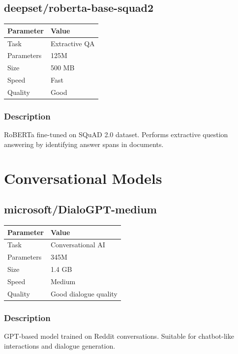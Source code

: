 \documentclass[12pt,a4paper]{report}
\begin{document}
\subsection{deepset/roberta-base-squad2}

\begin{tabular}{|p{3cm}|p{11cm}|}
\hline
\textbf{Parameter} & \textbf{Value} \\
\hline
Task & Extractive QA \\
\hline
Parameters & 125M \\
\hline
Size & 500 MB \\
\hline
Speed & Fast \\
\hline
Quality & Good \\
\hline
\end{tabular}

\subsubsection{Description}

RoBERTa fine-tuned on SQuAD 2.0 dataset. Performs extractive question answering by identifying answer spans in documents.

\section{Conversational Models}

\subsection{microsoft/DialoGPT-medium}

\begin{tabular}{|p{3cm}|p{11cm}|}
\hline
\textbf{Parameter} & \textbf{Value} \\
\hline
Task & Conversational AI \\
\hline
Parameters & 345M \\
\hline
Size & 1.4 GB \\
\hline
Speed & Medium \\
\hline
Quality & Good dialogue quality \\
\hline
\end{tabular}

\subsubsection{Description}

GPT-based model trained on Reddit conversations. Suitable for chatbot-like interactions and dialogue generation.
\end{document}
